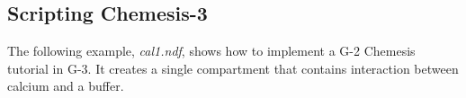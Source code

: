 \documentclass[11pt,3p,twocolumn]{JMN}
\begin{document}
%
%
%
%
%
%  
%
%

\subsection{Scripting Chemesis-3}

The following example, {\it cal1.ndf}, shows how to implement a G-2 Chemesis tutorial in G-3.  It creates a single compartment that contains interaction between calcium and a buffer.

\end{document}
